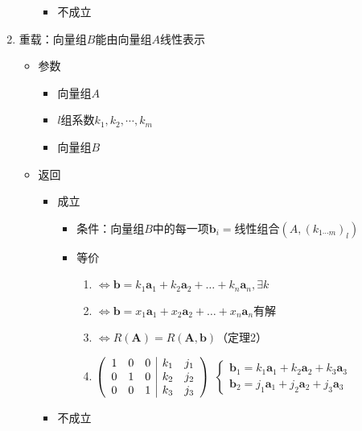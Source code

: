 \documentclass[UTF8,a4paper,12pt,scheme=chinese]{ctexbook}
\begin{document}
\begin{enumerate}
\begin{itemize}
\begin{itemize}
					
				\item 不成立
			\end{itemize}
		\end{itemize}
		\item 重载：向量组$ B $能由向量组$A$线性表示
		\begin{itemize}
			\item 参数
			\begin{itemize}
				\item 向量组$A$
				\item $l$组系数$k_1,k_2,\dotsb,k_m$
				\item 向量组$B$
			\end{itemize}
			\item 返回
			\begin{itemize}
				\item 成立
				\begin{itemize}
					\item 条件：向量组$ B $中的每一项$\boldsymbol{b}_i=$线性组合$(A,(k_{1\dotsb m})_l)$
					\item 等价
					\begin{enumerate}
						\item $\Leftrightarrow\boldsymbol{b}=k_1\boldsymbol{a}_1+k_2\boldsymbol{a}_2+\dots+k_n\boldsymbol{a}_n,\exists k$
						\item $\Leftrightarrow\boldsymbol{b}=x_1\boldsymbol{a}_1+x_2\boldsymbol{a}_2+\dots+x_n\boldsymbol{a}_n$有解
						\item $\Leftrightarrow R(\boldsymbol{A})=R(\boldsymbol{A},\boldsymbol{b})$（定理2）
						\item $
						\left(\begin{array}{c c c| c c}
						1 & 0 & 0 & k_1 & j_1 \\
						0 & 1 & 0 & k_2 & j_2 \\
						0 & 0 & 1 & k_3 & j_3
						\end{array}\right)
						$
						$
						\left\{ \begin{array}{l}
						\boldsymbol{b}_1 = k_1\boldsymbol{a}_1+k_2\boldsymbol{a}_2+k_3\boldsymbol{a}_3\\
						\boldsymbol{b}_2 = j_1\boldsymbol{a}_1+j_2\boldsymbol{a}_2+j_3\boldsymbol{a}_3
						\end{array} \right.
						$
					\end{enumerate}
				\end{itemize}
				\item 不成立
			\end{itemize}
		\end{itemize}
	\end{enumerate}
		
\end{document}
